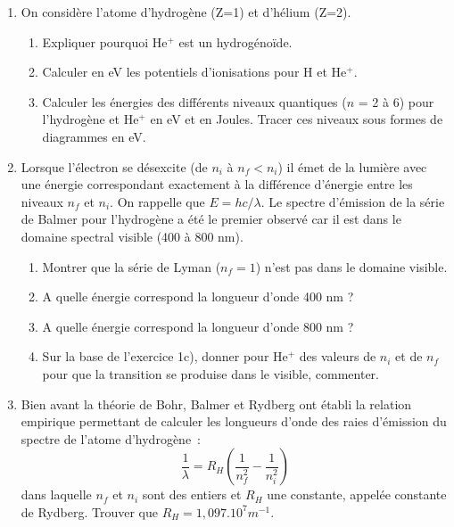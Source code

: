 
\begin{enumerate}[\bf 1)]
\item On consid\`ere l'atome d'hydrog\`ene (Z=1) et d'h\'elium (Z=2).
\begin{enumerate}
\item Expliquer pourquoi He$^+$ est un hydrog\'eno\"ide.
\item Calculer en eV les potentiels d'ionisations pour H et He$^+$.
\item Calculer les \'energies des diff\'erents niveaux quantiques ($n$ = 2 \`a 6) pour l'hydrog\`ene et He$^+$
en eV et en Joules. Tracer ces niveaux sous formes de diagrammes en eV.
\end{enumerate}

\item Lorsque l'\'electron se d\'esexcite (de $n_i$ \`a $n_f < n_i$) il \'emet de la lumi\`ere avec
une \'energie correspondant exactement \`a la diff\'erence d'\'energie entre les niveaux $n_f$ et $n_i$.
On rappelle que $E=hc/\lambda$. Le spectre d'\'emission de la s\'erie de Balmer pour l'hydrog\`ene
a \'et\'e le premier observ\'e car il est dans le domaine spectral visible (400 \`a 800 nm).
\begin{enumerate}
\item Montrer que la s\'erie de Lyman ($n_f =1$) n'est pas dans le domaine visible.
\item A quelle \'energie correspond la longueur d'onde 400 nm ?
\item A quelle \'energie correspond la longueur d'onde 800 nm ?
\item Sur la base de l'exercice 1c), donner pour He$^+$ des valeurs de $n_i$ et de $n_f$ pour
que la transition se produise dans le visible, commenter.
\end{enumerate}

\item Bien avant la th\'eorie de Bohr, Balmer et Rydberg ont \'etabli la relation empirique
permettant de calculer les longueurs d'onde des raies d'\'emission du spectre de l'atome d'hydrog\`ene~:
\begin{equation}
\label{eq_ryd}
\frac{1}{\lambda} = R_H \left( \frac{1}{n^2_f} - \frac{1}{n^2_i} \right)
\end{equation}
dans laquelle $n_f$ et $n_i$ sont des entiers et $R_H$ une constante, appel\'ee constante de Rydberg.
Trouver que $R_H = 1,097.10^7 m^{-1}$.
\end{enumerate}

